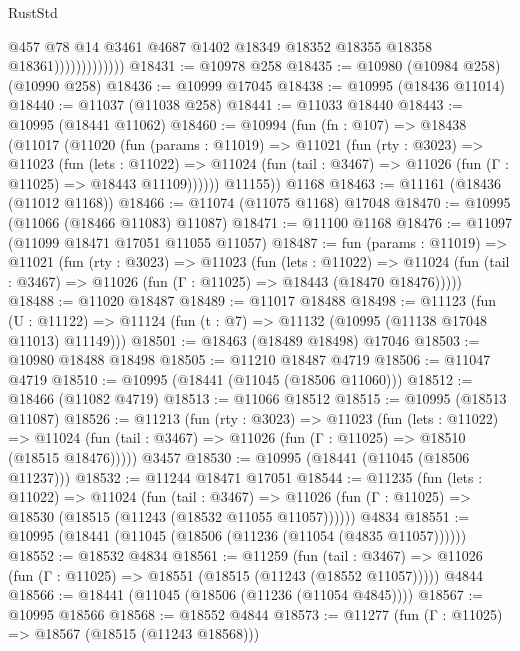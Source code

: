 \begin{lexlean}{RustStd}
\begin{coremodule}
                              @457
                              @78
                              @14
                              @3461
                              @4687
                              @1402
                              @18349
                              @18352
                              @18355
                              @18358
                              @18361)))))))))))))
@18431 := @10978 @258
@18435 := @10980 (@10984 @258) (@10990 @258)
@18436 := @10999 @17045
@18438 := @10995 (@18436 @11014)
@18440 := @11037 (@11038 @258)
@18441 := @11033 @18440
@18443 := @10995 (@18441 @11062)
@18460 := @10994
    (fun (fn : @107) =>
    @18438
      (@11017
        (@11020
          (fun (params : @11019) =>
          @11021
            (fun (rty : @3023) =>
            @11023
              (fun (lets : @11022) =>
              @11024 (fun (tail : @3467) => @11026 (fun (Γ : @11025) => @18443 @11109))))))
        @11155))
    @1168
@18463 := @11161 (@18436 (@11012 @1168))
@18466 := @11074 (@11075 @1168) @17048
@18470 := @10995 (@11066 (@18466 @11083) @11087)
@18471 := @11100 @1168
@18476 := @11097 (@11099 @18471 @17051 @11055 @11057)
@18487 := fun (params : @11019) =>
  @11021
    (fun (rty : @3023) =>
    @11023
      (fun (lets : @11022) =>
      @11024 (fun (tail : @3467) => @11026 (fun (Γ : @11025) => @18443 (@18470 @18476)))))
@18488 := @11020 @18487
@18489 := @11017 @18488
@18498 := @11123
    (fun (U : @11122) => @11124 (fun (t : @7) => @11132 (@10995 (@11138 @17048 @11013) @11149)))
@18501 := @18463 (@18489 @18498) @17046
@18503 := @10980 @18488 @18498
@18505 := @11210 @18487 @4719
@18506 := @11047 @4719
@18510 := @10995 (@18441 (@11045 (@18506 @11060)))
@18512 := @18466 (@11082 @4719)
@18513 := @11066 @18512
@18515 := @10995 (@18513 @11087)
@18526 := @11213
    (fun (rty : @3023) =>
    @11023
      (fun (lets : @11022) =>
      @11024 (fun (tail : @3467) => @11026 (fun (Γ : @11025) => @18510 (@18515 @18476)))))
    @3457
@18530 := @10995 (@18441 (@11045 (@18506 @11237)))
@18532 := @11244 @18471 @17051
@18544 := @11235
    (fun (lets : @11022) =>
    @11024
      (fun (tail : @3467) =>
      @11026 (fun (Γ : @11025) => @18530 (@18515 (@11243 (@18532 @11055 @11057))))))
    @4834
@18551 := @10995 (@18441 (@11045 (@18506 (@11236 (@11054 (@4835 @11057))))))
@18552 := @18532 @4834
@18561 := @11259
    (fun (tail : @3467) => @11026 (fun (Γ : @11025) => @18551 (@18515 (@11243 (@18552 @11057)))))
    @4844
@18566 := @18441 (@11045 (@18506 (@11236 (@11054 @4845))))
@18567 := @10995 @18566
@18568 := @18552 @4844
@18573 := @11277 (fun (Γ : @11025) => @18567 (@18515 (@11243 @18568)))

\end{coremodule}
\end{lexlean}
